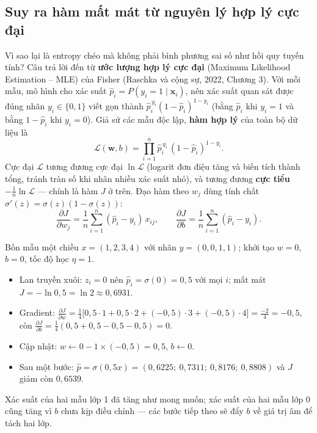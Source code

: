 \subsection{Suy ra hàm mất mát từ nguyên lý hợp lý cực đại}

Vì sao lại là entropy chéo mà không phải bình phương sai số như hồi quy tuyến tính? Câu trả lời đến từ \textbf{ước lượng hợp lý cực đại} (Maximum Likelihood Estimation -- MLE) của Fisher (Raschka và cộng sự, 2022, Chương 3). Với mỗi mẫu, mô hình cho xác suất $\hat{p}_i = P(y_i = 1 \mid \mathbf{x}_i)$, nên xác suất quan sát được đúng nhãn $y_i \in \{0, 1\}$ viết gọn thành $\hat{p}_i^{\,y_i}(1 - \hat{p}_i)^{1 - y_i}$ (bằng $\hat{p}_i$ khi $y_i = 1$ và bằng $1 - \hat{p}_i$ khi $y_i = 0$). Giả sử các mẫu độc lập, \textbf{hàm hợp lý} của toàn bộ dữ liệu là
\begin{equation}
    \mathcal{L}(\mathbf{w}, b) = \prod_{i=1}^{n} \hat{p}_i^{\,y_i}\,(1 - \hat{p}_i)^{1 - y_i} .
\end{equation}
Cực đại $\mathcal{L}$ tương đương cực đại $\ln\mathcal{L}$ (logarit đơn điệu tăng và biến tích thành tổng, tránh tràn số khi nhân nhiều xác suất nhỏ), và tương đương \textbf{cực tiểu} $-\frac{1}{n}\ln\mathcal{L}$ --- chính là hàm $J$ ở trên. Đạo hàm theo $w_j$ dùng tính chất $\sigma'(z) = \sigma(z)(1 - \sigma(z))$:
\begin{equation}
    \frac{\partial J}{\partial w_j} = \frac{1}{n}\sum_{i=1}^{n}(\hat{p}_i - y_i)\,x_{ij}, \qquad
    \frac{\partial J}{\partial b} = \frac{1}{n}\sum_{i=1}^{n}(\hat{p}_i - y_i).
\end{equation}

\begin{example}
Bốn mẫu một chiều $x = (1, 2, 3, 4)$ với nhãn $y = (0, 0, 1, 1)$; khởi tạo $w = 0$, $b = 0$, tốc độ học $\eta = 1$.
\begin{itemize}
    \item Lan truyền xuôi: $z_i = 0$ nên $\hat{p}_i = \sigma(0) = 0{,}5$ với mọi $i$; mất mát $J = -\ln 0{,}5 = \ln 2 \approx 0{,}6931$.
    \item Gradient: $\frac{\partial J}{\partial w} = \frac{1}{4}\big[0{,}5 \cdot 1 + 0{,}5 \cdot 2 + (-0{,}5) \cdot 3 + (-0{,}5) \cdot 4\big] = \frac{-2}{4} = -0{,}5$, còn $\frac{\partial J}{\partial b} = \frac{1}{4}(0{,}5 + 0{,}5 - 0{,}5 - 0{,}5) = 0$.
    \item Cập nhật: $w \leftarrow 0 - 1 \times (-0{,}5) = 0{,}5$, $b \leftarrow 0$.
    \item Sau một bước: $\hat{p} = \sigma(0{,}5 x) = (0{,}6225;\ 0{,}7311;\ 0{,}8176;\ 0{,}8808)$ và $J$ giảm còn $0{,}6539$.
\end{itemize}
Xác suất của hai mẫu lớp 1 đã tăng như mong muốn; xác suất của hai mẫu lớp 0 cũng tăng vì $b$ chưa kịp điều chỉnh --- các bước tiếp theo sẽ đẩy $b$ về giá trị âm để tách hai lớp.
\end{example}

